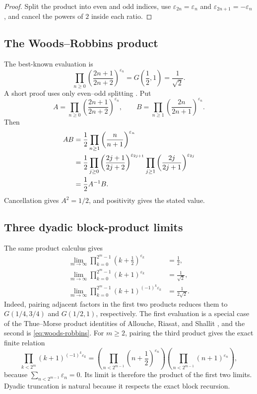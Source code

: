 \documentclass[11pt,oneside]{article}
\theoremstyle{definition}
\theoremstyle{remark}
\newcommand{\eps}{\varepsilon}
\begin{document}
\begin{proof}
Split the product into even and odd indices, use
$\eps_{2n}=\eps_n$ and $\eps_{2n+1}=-\eps_n$, and cancel the powers of $2$
inside each ratio.
\end{proof}

\subsection{The Woods--Robbins product}

The best-known evaluation is
\begin{equation}\label{eq:woods-robbins}
 \boxed{\qquad
 \prod_{n\ge0}
 \left(\frac{2n+1}{2n+2}\right)^{\eps_n}
 =G\!\left(\frac12,1\right)=\frac1{\sqrt2}.
 \qquad}
\end{equation}
A short proof uses only even--odd splitting \cite{woods1978,robbins1979}.
Put
\begin{equation}\label{eq:A-B-products}
 A=\prod_{n\ge0}\left(\frac{2n+1}{2n+2}\right)^{\eps_n},
 \qquad
 B=\prod_{n\ge1}\left(\frac{2n}{2n+1}\right)^{\eps_n}.
\end{equation}
Then
\begin{align}
 AB
 &=\frac12\prod_{n\ge1}
   \left(\frac n{n+1}\right)^{\eps_n}\notag\\
 &=\frac12
   \prod_{j\ge0}\left(\frac{2j+1}{2j+2}\right)^{\eps_{2j+1}}
   \prod_{j\ge1}\left(\frac{2j}{2j+1}\right)^{\eps_{2j}}\notag\\
 &=\frac12A^{-1}B.
\end{align}
Cancellation gives $A^2=1/2$, and positivity gives the stated value.

\subsection{Three dyadic block-product limits}

The same product calculus gives
\begin{align}
 \lim_{m\to\infty}
 \prod_{k=0}^{2^m-1}\left(k+\frac12\right)^{\eps_k}
 &=\frac12,\label{eq:block-product-1}\\
 \lim_{m\to\infty}
 \prod_{k=0}^{2^m-1}(k+1)^{\eps_k}
 &=\frac1{\sqrt2},\label{eq:block-product-2}\\
 \lim_{m\to\infty}
 \prod_{k=0}^{2^m-1}(k+1)^{(-1)^k\eps_k}
 &=\frac1{2\sqrt2}.
 \label{eq:block-product-3}
\end{align}
Indeed, pairing adjacent factors in the first two products reduces them to
$G(1/4,3/4)$ and $G(1/2,1)$, respectively.  The first evaluation is a special
case of the Thue--Morse product identities of Allouche, Riasat, and Shallit
\cite{alloucheriasatshallit2019}, and the second is
\cref{eq:woods-robbins}.  For $m\ge2$, pairing the third product gives the
exact finite relation
\[
 \prod_{k<2^m}(k+1)^{(-1)^k\eps_k}
 =\left(\prod_{n<2^{m-1}}\left(n+\frac12\right)^{\eps_n}\right)
  \left(\prod_{n<2^{m-1}}(n+1)^{\eps_n}\right),
\]
because $\sum_{n<2^{m-1}}\eps_n=0$.  Its limit is therefore the product of
the first two limits.  Dyadic truncation is natural because it respects the
exact block recursion.
\end{document}

